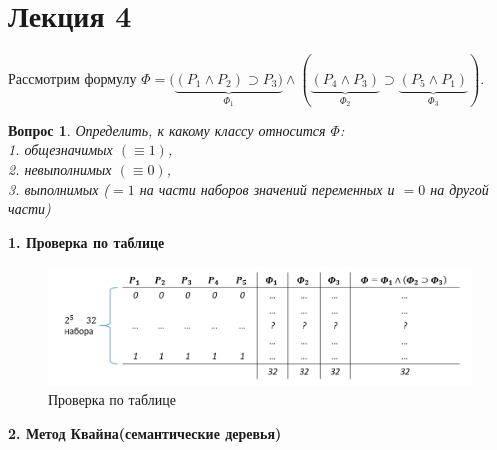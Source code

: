 \documentclass{article}
\newtheorem{question}{Вопрос}
\numberwithin{example}{section}
\numberwithin{question}{section}
\numberwithin{Remark}{section}
\numberwithin{theorem}{section}
\numberwithin{definition}{section}
\numberwithin{proposition}{section}
\begin{document}
\section{Лекция 4}
Рассмотрим формулу $\Phi=(\underbrace{(P_1\wedge P_2)\supset P_3)}_{\Phi_1}\wedge(\underbrace{(P_4\wedge P_3)}_{\Phi_2}\supset\underbrace{(P_5\wedge P_1)}_{\Phi_3})$.
\begin{question}
Определить, к какому классу относится $\Phi$:\\
1. общезначимых $(\equiv 1)$,\\
2. невыполнимых $(\equiv 0)$,\\
3. выполнимых ($=1$ на части наборов значений переменных и $=0$ на другой части) 
\end{question}
\noindent\textbf{1. Проверка по таблице}\\
\begin{figure}[!htbp]
	\centering
	\includegraphics[width=0.9\linewidth]{4-1}
	\caption{Проверка по таблице}
	\label{fig:4-1}
\end{figure}
\textbf{2. Метод Квайна(семантические деревья)}\\
\end{document}
